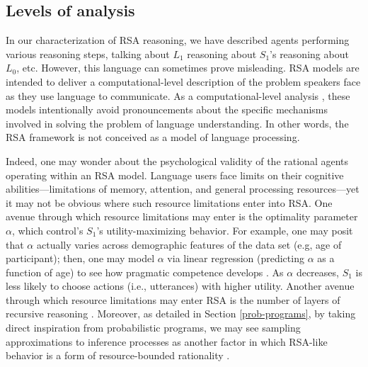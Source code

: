 \documentclass{sp}
\begin{document}
\subsection{Levels of analysis}

In our characterization of RSA reasoning, we have described agents performing various reasoning steps, talking about $L_1$ reasoning about $S_1$'s reasoning about $L_0$, etc. However, this language can sometimes prove misleading. RSA models are intended to deliver a computational-level description of the problem speakers face as they use language to communicate. As a computational-level analysis \citep{marr1982}, these models intentionally avoid pronouncements about the specific mechanisms involved in solving the problem of language understanding. In other words, the RSA framework is not conceived as a model of language processing.

Indeed, one may wonder about the psychological validity of the rational agents operating within an RSA model.
Language users face limits on their cognitive abilities---limitations of memory, attention, and general processing resources---yet it may not be obvious where such resource limitations enter into RSA.
One avenue through which resource limitations may enter is the optimality parameter $\alpha$, which control's $S_1$'s utility-maximizing behavior.
For example, one may posit that $\alpha$ actually varies across demographic features of the data set (e.g, age of participant); then, one may model $\alpha$ via linear regression (predicting $\alpha$ as a function of age) to see how pragmatic competence develops \citep{bohn2019predicting}.
As $\alpha$ decreases, $S_1$ is less likely to choose actions (i.e., utterances) with higher utility.
Another avenue through which resource limitations may enter RSA is the number of layers of recursive reasoning \citep{FrankeDegen2015:Reasoning-in-Re}.
Moreover, as detailed in Section \ref{prob-programs}, by taking direct inspiration from probabilistic programs, we may see sampling approximations to inference processes as another factor in which RSA-like behavior is a form of resource-bounded rationality \citep{GriffithsLieder2015:Rational-Use-of}.
\end{document}
